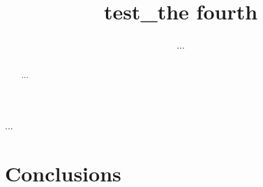 \documentclass[journal, 10pt]{IEEEtran}
\title{test_the fourth}
\author{...}
\begin{document}
\maketitle


\begin{abstract}

...

\end{abstract}

\begin{IEEEkeywords}

...

\end{IEEEkeywords}














\section{Conclusions}




%

%
\end{document}
